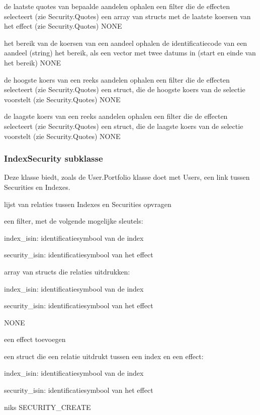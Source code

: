 	{ de laatste quotes van bepaalde aandelen ophalen }
	{ een filter die de effecten selecteert (zie Security.Quotes) }
	{ een array van structs met de laatste koersen van het effect (zie Security.Quotes) }
	{ NONE }

	{ het bereik van de koersen van een aandeel ophalen }
	{ de identificatiecode van een aandeel (string) }
	{ het bereik, als een vector met twee datums in (start en einde van het bereik) }
	{ NONE }

	{ de hoogste koers van een reeks aandelen ophalen }
	{ een filter die de effecten selecteert (zie Security.Quotes) }
	{ een struct, die de hoogste koers van de selectie voorstelt (zie Security.Quotes) }
	{ NONE }

	{ de laagste koers van een reeks aandelen ophalen }
	{ een filter die de effecten selecteert (zie Security.Quotes) }
	{ een struct, die de laagste koers van de selectie voorstelt (zie Security.Quotes) }
	{ NONE }


\subsubsection{IndexSecurity subklasse}

Deze klasse biedt, zoals de User.Portfolio klasse doet met Users, een link tussen Securities en Indexes.

	{ lijst van relaties tussen Indexes en Securities opvragen }
	{ een filter, met de volgende mogelijke sleutels:
		\begin{itemize_compact}
		\item{index\_isin: identificatiesymbool van de index}
		\item{security\_isin: identificatiesymbool van het effect}
		\end{itemize_compact} }
	{ array van structs die relaties uitdrukken:
		\begin{itemize_compact}
		\item{index\_isin: identificatiesymbool van de index}
		\item{security\_isin: identificatiesymbool van het effect}
		\end{itemize_compact} }
	{ NONE }

	{ een effect toevoegen }
	{ een struct die een relatie uitdrukt tussen een index en een effect:
		\begin{itemize_compact}
		\item{index\_isin: identificatiesymbool van de index}
		\item{security\_isin: identificatiesymbool van het effect}
		\end{itemize_compact} }
	{ niks }
	{ SECURITY\_CREATE }


